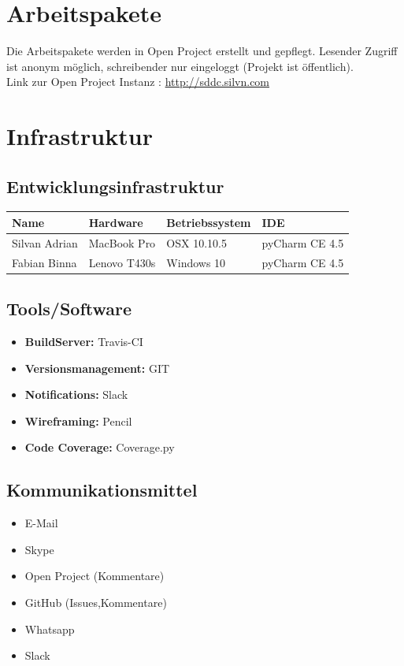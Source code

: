 \documentclass[11pt]{scrartcl}
\begin{document}
\section{Arbeitspakete}

Die Arbeitspakete werden in Open Project erstellt und gepflegt.
Lesender Zugriff ist anonym möglich, schreibender nur eingeloggt (Projekt ist öffentlich). 
\\
Link zur Open Project Instanz : \href{http://sddc.silvn.com}{http://sddc.silvn.com}

\section{Infrastruktur}

\subsection{Entwicklungsinfrastruktur}

\begin{tabularx}{\textwidth}{X X X X}
\textbf{Name} & \textbf{Hardware} & \textbf{Betriebssystem} & \textbf{IDE} \\
\hline
Silvan Adrian & MacBook Pro & OSX 10.10.5 &  pyCharm CE 4.5 \\
\hline
Fabian Binna & Lenovo T430s & Windows 10 &  pyCharm CE 4.5\\
\hline
\end{tabularx}

\subsection{Tools/Software}
\begin{itemize}
    \item \textbf{BuildServer:} Travis-CI
    \item \textbf{Versionsmanagement:} GIT
    \item \textbf{Notifications:} Slack
    \item \textbf{Wireframing:} Pencil
    \item \textbf{Code Coverage:} Coverage.py
\end{itemize}

\subsection{Kommunikationsmittel}
\begin{itemize}
    \item E-Mail
    \item Skype
    \item Open Project (Kommentare)
    \item GitHub (Issues,Kommentare)
    \item Whatsapp
    \item Slack
\end{itemize}
\end{document}
